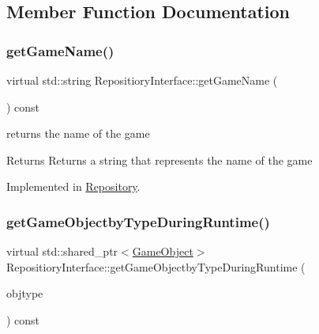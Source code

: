 \subsection{Member Function Documentation}
\mbox{\label{class_repositiory_interface_aa40617b92b721ec087dd69f3986e9efd}} 
\subsubsection{\texorpdfstring{get\+Game\+Name()}{getGameName()}}
{\footnotesize\ttfamily virtual std\+::string Repositiory\+Interface\+::get\+Game\+Name (\begin{DoxyParamCaption}{ }\end{DoxyParamCaption}) const\hspace{0.3cm}{\ttfamily [pure virtual]}}



returns the name of the game 

\begin{DoxyReturn}{Returns}
Returns a string that represents the name of the game 
\end{DoxyReturn}


Implemented in \hyperlink{class_repository_a9bdfb4cab4ece2af1e45ef5ef06b9e49}{Repository}.

\mbox{\label{class_repositiory_interface_a7341b8009f262949e26759327b0a8ae4}} 
\subsubsection{\texorpdfstring{get\+Game\+Objectby\+Type\+During\+Runtime()}{getGameObjectbyTypeDuringRuntime()}}
{\footnotesize\ttfamily virtual std\+::shared\+\_\+ptr$<$\hyperlink{class_game_object}{Game\+Object}$>$ Repositiory\+Interface\+::get\+Game\+Objectby\+Type\+During\+Runtime (\begin{DoxyParamCaption}\item[{Game\+Object\+Type}]{objtype }\end{DoxyParamCaption}) const\hspace{0.3cm}{\ttfamily [pure virtual]}}



